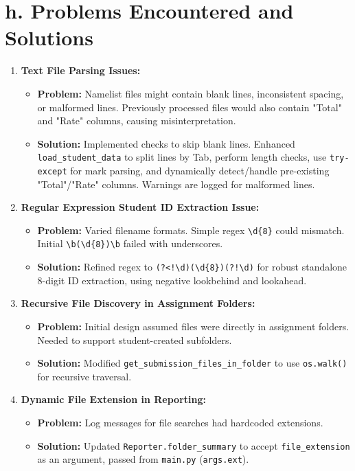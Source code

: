 \documentclass[11pt, a4paper]{article}
\begin{document}
\section*{h. Problems Encountered and Solutions}
\begin{enumerate}[leftmargin=*]
    \item \textbf{Text File Parsing Issues:}
    \begin{itemize}
        \item \textbf{Problem:} Namelist files might contain blank lines, inconsistent spacing, or malformed lines. Previously processed files would also contain "Total" and "Rate" columns, causing misinterpretation.
        \item \textbf{Solution:} Implemented checks to skip blank lines. Enhanced \texttt{load\_student\_data} to split lines by Tab, perform length checks, use \texttt{try-except} for mark parsing, and dynamically detect/handle pre-existing "Total"/"Rate" columns. Warnings are logged for malformed lines.
    \end{itemize}

    \item \textbf{Regular Expression Student ID Extraction Issue:}
    \begin{itemize}
        \item \textbf{Problem:} Varied filename formats. Simple regex \texttt{\textbackslash d\{8\}} could mismatch. Initial \texttt{\textbackslash b(\textbackslash d\{8\})\textbackslash b} failed with underscores.
        \item \textbf{Solution:} Refined regex to \texttt{(?<!\textbackslash d)(\textbackslash d\{8\})(?!\textbackslash d)} for robust standalone 8-digit ID extraction, using negative lookbehind and lookahead.
    \end{itemize}

    \item \textbf{Recursive File Discovery in Assignment Folders:}
    \begin{itemize}
        \item \textbf{Problem:} Initial design assumed files were directly in assignment folders. Needed to support student-created subfolders.
        \item \textbf{Solution:} Modified \texttt{get\_submission\_files\_in\_folder} to use \texttt{os.walk()} for recursive traversal.
    \end{itemize}
    
    \item \textbf{Dynamic File Extension in Reporting:}
    \begin{itemize}
        \item \textbf{Problem:} Log messages for file searches had hardcoded extensions.
        \item \textbf{Solution:} Updated \texttt{Reporter.folder\_summary} to accept \texttt{file\_extension} as an argument, passed from \texttt{main.py} (\texttt{args.ext}).
    \end{itemize}


\end{enumerate}
\end{document}
